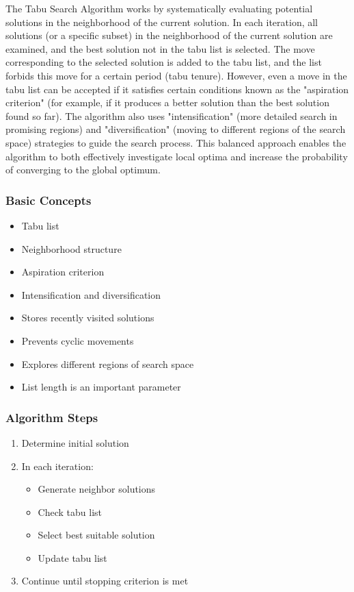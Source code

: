 The Tabu Search Algorithm works by systematically evaluating potential solutions in the neighborhood of the current solution. In each iteration, all solutions (or a specific subset) in the neighborhood of the current solution are examined, and the best solution not in the tabu list is selected. The move corresponding to the selected solution is added to the tabu list, and the list forbids this move for a certain period (tabu tenure). However, even a move in the tabu list can be accepted if it satisfies certain conditions known as the "aspiration criterion" (for example, if it produces a better solution than the best solution found so far). The algorithm also uses "intensification" (more detailed search in promising regions) and "diversification" (moving to different regions of the search space) strategies to guide the search process. This balanced approach enables the algorithm to both effectively investigate local optima and increase the probability of converging to the global optimum.

\subsubsection{Basic Concepts}
\begin{itemize}
    \item Tabu list
    \item Neighborhood structure
    \item Aspiration criterion
    \item Intensification and diversification
\end{itemize}

\begin{tcolorbox}[title=Role of Tabu List]
\begin{itemize}
    \item Stores recently visited solutions
    \item Prevents cyclic movements
    \item Explores different regions of search space
    \item List length is an important parameter
\end{itemize}
\end{tcolorbox}

\subsubsection{Algorithm Steps}
\begin{enumerate}
    \item Determine initial solution
    \item In each iteration:
        \begin{itemize}
            \item Generate neighbor solutions
            \item Check tabu list
            \item Select best suitable solution
            \item Update tabu list
        \end{itemize}
    \item Continue until stopping criterion is met
\end{enumerate}


